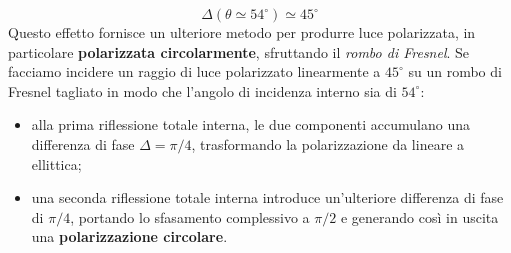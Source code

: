 \documentclass[openany,a4paper,12pt]{book}
\begin{document}
\[
    \Delta(\theta \simeq 54^\circ) \simeq 45^\circ
\]
Questo effetto fornisce un ulteriore metodo per produrre luce polarizzata, in particolare \textbf{polarizzata circolarmente}, sfruttando il \textit{rombo di Fresnel}.
Se facciamo incidere un raggio di luce polarizzato linearmente a $45^\circ$ su un rombo di Fresnel tagliato in modo che l'angolo di incidenza interno sia di $54^\circ$:
\begin{itemize}
    \item alla prima riflessione totale interna, le due componenti accumulano una differenza di fase $\Delta = \pi/4$, trasformando la polarizzazione da lineare a ellittica;
    \item una seconda riflessione totale interna introduce un'ulteriore differenza di fase di $\pi/4$, portando lo sfasamento complessivo a $\pi/2$ e generando così in uscita una \textbf{polarizzazione circolare}.
\end{itemize}
\end{document}
